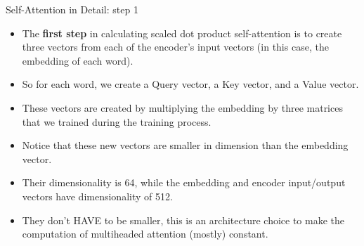 \documentclass[handout]{beamer}
\begin{document}
\begin{frame}{Self-Attention in Detail: step 1}
\begin{scriptsize}



\begin{itemize}


\item The \textbf{first step} in calculating scaled dot product self-attention is to create three vectors from each of the encoder's input vectors (in this case, the embedding of each word).

\item So for each word, we create a Query vector, a Key vector, and a Value vector.

\item These vectors are created by multiplying the embedding by three matrices that we trained during the training process.

\item Notice that these new vectors are smaller in dimension than the embedding vector. 

\item Their dimensionality is 64, while the embedding and encoder input/output vectors have dimensionality of 512. 

\item They don’t HAVE to be smaller, this is an architecture choice to make the computation of multiheaded attention (mostly) constant.

\end{itemize}

\end{scriptsize}


\end{frame}
\end{document}
